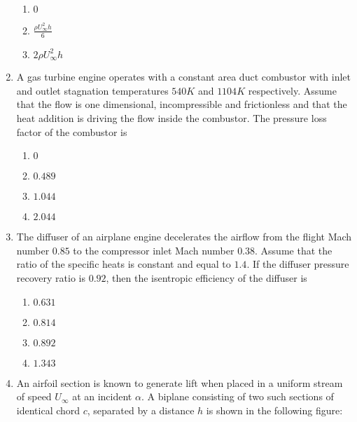 \documentclass[journal]{IEEEtran}
\begin{document}
\begin{enumerate}
\begin{enumerate}
			\item $0$
			\item $\frac{\rho U^2_{\infty}h}{6}$
			\item $2\rho U^2_{\infty}h$
		\end{enumerate}
	\item A gas turbine engine operates with a constant area duct combustor with inlet and outlet stagnation temperatures $540 K$ and $1104 K$ respectively. Assume that the flow is one dimensional, incompressible and frictionless and that the heat addition is driving the flow inside the combustor. The pressure loss factor  of the combustor is
		\begin{enumerate}
			\item $ 0$
			\item $0.489$
			\item $1.044$
			\item $2.044$
		\end{enumerate}
	\item The diffuser of an airplane engine decelerates the airflow from the flight Mach number $0.85$ to the compressor inlet Mach number $0.38$. Assume that the ratio of the specific heats is constant and equal to $1.4$. If the diffuser pressure recovery ratio is $0.92$, then the isentropic efficiency of the diffuser is
		\begin{enumerate}
			\item $0.631$
			\item $0.814$
			\item $0.892$
			\item $1.343$
		\end{enumerate}
	\item An airfoil section is known to generate lift when placed in a uniform stream of speed $U_{\infty}$ at an incident $\alpha$. A biplane consisting of two such sections of identical chord $c$, separated by a distance $h$ is shown in the following figure:
		\begin{figure}[h!]
			
		\end{figure}


\end{enumerate}
\end{document}
